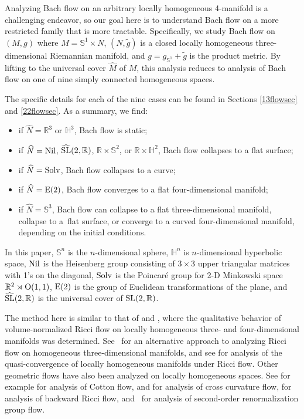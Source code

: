 \documentclass[pdftex]{sigma}
\numberwithin{equation}{section}
\begin{document}
Analyzing Bach flow on an arbitrary locally homogeneous 4-manifold is a challenging endeavor, so our goal here is to understand Bach flow on a more restricted family that is more tractable. Specifically, we study Bach flow on $(M, g)$ where $M = \mathbb{S}^1 \times N$, $(N, \tilde{g})$ is a closed locally homogeneous three-dimensional Riemannian manifold, and $g = g_{\mathbb{S}^1} + \tilde{g}$ is the product metric. By lifting to the universal cover $\widehat{M}$ of $M$, this analysis reduces to analysis of Bach flow on one of nine simply connected homogeneous spaces.

The specific details for each of the nine cases can be found in Sections \ref{13flowsec} and \ref{22flowsec}. As a summary, we find:
\begin{itemize}\itemsep=0pt
\item if $\widehat{N} = \mathbb{R}^3$ or $\mathbb{H}^3$, Bach flow is static;
\item if $\widehat{N} = {\rm Nil}$, $\widehat{{\rm SL}}(2,\mathbb{R})$, $\mathbb{R} \times \mathbb{S}^2$, or $\mathbb{R} \times \mathbb{H}^2$, Bach flow collapses to a flat surface;
\item if $\widehat{N} = {\rm Solv}$, Bach flow collapses to a curve;
\item if $\widehat{N} = {\rm E}(2)$, Bach flow converges to a flat four-dimensional manifold;
\item if  $\widehat{N} = \mathbb{S}^3$, Bach flow can collapse to a flat three-dimensional manifold, collapse to a~flat surface, or converge to a curved four-dimensional manifold, depending on the initial conditions.
\end{itemize}
In this paper, $\mathbb{S}^n$ is the $n$-dimensional sphere, $\mathbb{H}^n$ is $n$-dimensional hyperbolic space, ${\rm Nil}$ is the Heisenberg group consisting of $3 \times 3$ upper triangular matrices with 1's on the diagonal, ${\rm Solv}$ is the Poincar\'{e} group for 2-D Minkowski space $\mathbb{R}^2 \rtimes {\rm O}(1,1)$, ${\rm E}(2)$ is the group of Euclidean transformations of the plane, and $\widehat{{\rm SL}}(2, \mathbb{R})$ is the universal cover of ${\rm SL}(2, \mathbb{R})$.

 The method here is similar to that of \cite{IJ} and \cite{IJL}, where the qualitative behavior of volume-normalized Ricci flow on locally homogeneous three- and four-dimensional manifolds was determined. See~\cite{GlickPayne} for an alternative approach to analyzing Ricci flow on homogeneous three-dimensional manifolds, and see \cite{KM} for analysis of the quasi-convergence of locally homogeneous manifolds under Ricci flow. Other geometric flows have also been analyzed on locally homogeneous spaces. See for example \cite{KST} for analysis of Cotton flow, \cite{CNSC} and \cite{CSC2} for analysis of cross curvature flow, \cite{CSC} for analysis of backward Ricci flow, and~\cite{GGI} for analysis of second-order renormalization group flow.
\end{document}
